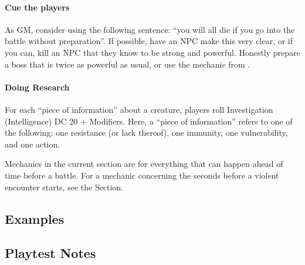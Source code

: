 \documentclass[twocolumn]{dndbook}
\begin{document}
\paragraph*{Cue the players}
As GM, consider using the following sentence: ``you will all die if you go into the battle without preparation''.
If possible, have an NPC make this very clear, or if you can, kill an NPC that they know to be strong and powerful.
Honestly prepare a boss that is twice as powerful as usual, or use the mechanic from .\par

\paragraph*{Doing Research}

For each ``piece of information'' about a creature, players roll Investigation (Intelligence) DC 20 + Modifiers.
Here, a ``piece of information'' refers to one of the following: one resistance (or lack thereof), one immunity, one vulnerability, and one action.\par



\begin{emphasisParagraph}
	Mechanics in the current section are for everything that can happen ahead of time before a battle.
	For a mechanic concerning the seconds before a violent encounter starts, see the  Section.\par
\end{emphasisParagraph}


\subsection{Examples}

\subsection{Playtest Notes}

\end{document}
